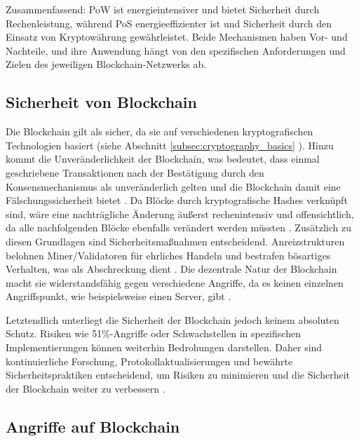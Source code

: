 \noindent Zusammenfassend: PoW ist energieintensiver und bietet Sicherheit durch Rechenleistung, während PoS energieeffizienter ist und Sicherheit durch den Einsatz von Kryptowährung gewährleistet. Beide Mechanismen haben Vor- und Nachteile, und ihre Anwendung hängt von den spezifischen Anforderungen und Zielen des jeweiligen Blockchain-Netzwerks ab.


\subsection{Sicherheit von Blockchain}

Die Blockchain gilt als sicher, da sie auf verschiedenen kryptografischen Technologien basiert (siehe Abschnitt \ref{subsec:cryptography_basics} \textit{}). Hinzu kommt die Unveränderlichkeit der Blockchain, was bedeutet, dass einmal geschriebene Transaktionen nach der Bestätigung durch den Konsensmechanismus als unveränderlich gelten und die Blockchain damit eine Fälschungssicherheit bietet \Parencites[S. 1-2]{Landerreche_ImmutabilityOfBlockchains}[S. 70]{Brünnler_BlockchainKurzGut}. Da Blöcke durch kryptografische Hashes verknüpft sind, wäre eine nachträgliche Änderung äußerst rechenintensiv und offensichtlich, da alle nachfolgenden Blöcke ebenfalls verändert werden müssten \Parencite[S. 12]{Fill_BlockchainGrundlagen}. Zusätzlich zu diesen Grundlagen sind Sicherheitsmaßnahmen entscheidend. Anreizstrukturen belohnen Miner/Validatoren für ehrliches Handeln und bestrafen bösartiges Verhalten, was als Abschreckung dient \parencite[S. 320-321]{Antonopoulos_MasteringEthereum}. Die dezentrale Natur der Blockchain macht sie widerstandsfähig gegen verschiedene Angriffe, da es keinen einzelnen Angriffspunkt, wie beispielsweise einen Server, gibt \parencite[S. 31]{Fill_BlockchainGrundlagen}.

Letztendlich unterliegt die Sicherheit der Blockchain jedoch keinem absoluten Schutz. Risiken wie 51\%-Angriffe oder Schwachstellen in spezifischen Implementierungen können weiterhin Bedrohungen darstellen. Daher sind kontinuierliche Forschung, Protokollaktualisierungen und bewährte Sicherheitspraktiken entscheidend, um Risiken zu minimieren und die Sicherheit der Blockchain weiter zu verbessern \parencites{Nam_51PercentAttacks}{Perez_SmartContractVulnerabilities}.


\subsection{Angriffe auf Blockchain}

